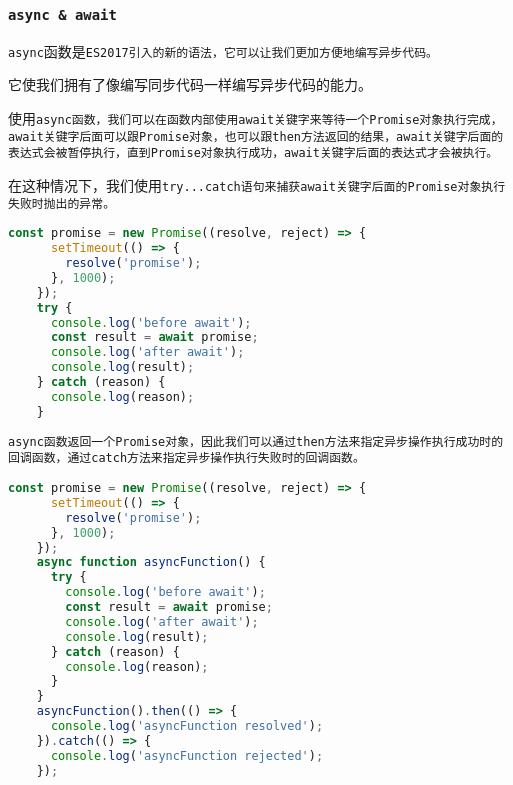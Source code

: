 \documentclass{beamer}
\begin{document}
\begin{frame}
  \frametitle{\texttt{async \& await}}

  \texttt{async}函数是\tt{ES2017}引入的新的语法，它可以让我们更加方便地编写异步代码。

  \vspace{1em}

  它使我们拥有了像编写同步代码一样编写异步代码的能力。


  \vspace{1em}



  使用\tt{async}函数，我们可以在函数内部使用\tt{await}关键字来等待一个\tt{Promise}对象执行完成，\tt{await}关键字后面可以跟\tt{Promise}对象，也可以跟\tt{then}方法返回的结果，\tt{await}关键字后面的表达式会被暂停执行，直到\tt{Promise}对象执行成功，\tt{await}关键字后面的表达式才会被执行。
  \vspace{1em}

  在这种情况下，我们使用\tt{try...catch}语句来捕获\tt{await}关键字后面的\tt{Promise}对象执行失败时抛出的异常。

  \begin{lstlisting}[language=JavaScript]
    const promise = new Promise((resolve, reject) => {
      setTimeout(() => {
        resolve('promise');
      }, 1000);
    });
    try {
      console.log('before await');
      const result = await promise;
      console.log('after await');
      console.log(result);
    } catch (reason) {
      console.log(reason);
    }
\end{lstlisting}

  \framebreak

  \tt{async}函数返回一个\tt{Promise}对象，因此我们可以通过\tt{then}方法来指定异步操作执行成功时的回调函数，通过\tt{catch}方法来指定异步操作执行失败时的回调函数。

  \begin{lstlisting}[language=JavaScript]
    const promise = new Promise((resolve, reject) => {
      setTimeout(() => {
        resolve('promise');
      }, 1000);
    });
    async function asyncFunction() {
      try {
        console.log('before await');
        const result = await promise;
        console.log('after await');
        console.log(result);
      } catch (reason) {
        console.log(reason);
      }
    }
    asyncFunction().then(() => {
      console.log('asyncFunction resolved');
    }).catch(() => {
      console.log('asyncFunction rejected');
    });
  \end{lstlisting}


\end{frame}
\end{document}
